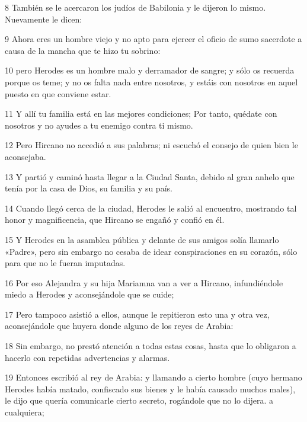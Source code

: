 \par 8 También se le acercaron los judíos de Babilonia y le dijeron lo mismo. Nuevamente le dicen:

\par 9 Ahora eres un hombre viejo y no apto para ejercer el oficio de sumo sacerdote a causa de la mancha que te hizo tu sobrino:

\par 10 pero Herodes es un hombre malo y derramador de sangre; y sólo os recuerda porque os teme; y no os falta nada entre nosotros, y estáis con nosotros en aquel puesto en que conviene estar.

\par 11 Y allí tu familia está en las mejores condiciones; Por tanto, quédate con nosotros y no ayudes a tu enemigo contra ti mismo.

\par 12 Pero Hircano no accedió a sus palabras; ni escuchó el consejo de quien bien le aconsejaba.

\par 13 Y partió y caminó hasta llegar a la Ciudad Santa, debido al gran anhelo que tenía por la casa de Dios, su familia y su país.

\par 14 Cuando llegó cerca de la ciudad, Herodes le salió al encuentro, mostrando tal honor y magnificencia, que Hircano se engañó y confió en él.

\par 15 Y Herodes en la asamblea pública y delante de sus amigos solía llamarlo «Padre», pero sin embargo no cesaba de idear conspiraciones en su corazón, sólo para que no le fueran imputadas.

\par 16 Por eso Alejandra y su hija Mariamna van a ver a Hircano, infundiéndole miedo a Herodes y aconsejándole que se cuide;

\par 17 Pero tampoco asistió a ellos, aunque le repitieron esto una y otra vez, aconsejándole que huyera donde alguno de los reyes de Arabia:

\par 18 Sin embargo, no prestó atención a todas estas cosas, hasta que lo obligaron a hacerlo con repetidas advertencias y alarmas.

\par 19 Entonces escribió al rey de Arabia: y llamando a cierto hombre (cuyo hermano Herodes había matado, confiscado sus bienes y le había causado muchos males), le dijo que quería comunicarle cierto secreto, rogándole que no lo dijera. a cualquiera;

